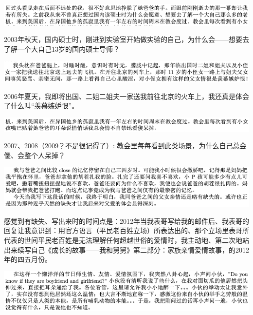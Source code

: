 \documentclass[9pt, b5paper]{article}
\begin{document}
\begin{center}
\includegraphics[width=.9\linewidth]{./pic/backups_plans_20210423_110746.png}
\end{center}

2003年秋天，国内硕士时，刚进到实验室开始做实验的自己，为什么会——想要去了解一个大自己13岁的国内硕士导师？

\begin{center}
\includegraphics[width=.9\linewidth]{./pic/backups_plans_20210423_104428.png}
\end{center}

2006年夏天，我即将出国、二姐二姐夫一家送我前往北京的火车上，我还真是体会了什么叫“羡慕嫉妒恨”。

\begin{center}
\includegraphics[width=.9\linewidth]{./pic/backups_plans_20210423_110834.png}
\end{center}

2007、2008（2009？不是很记得了）: 教会里每每看到此类场景，为什么自己总会傻、会整个人呆掉？

\begin{center}
\includegraphics[width=.9\linewidth]{./pic/backups_plans_20210423_105443.png}
\end{center}

感觉到有缺失、写出来时的时间点是：2012年当我表哥写给我的邮件后、我表哥的回复让我意识到：用官方语言（平民老百姓立场）所表达出的、那个立场里表哥所代表的世间平民老百姓是无法理解任何超越世俗的爱情时，我主动地、第二次地站出来续写自己《成长的故事——我和舅舅》第二部分：家族亲情爱情故事，的2012年的四五月份。

\begin{center}
\includegraphics[width=.9\linewidth]{./pic/backups_plans_20210422_114817.png}
\end{center}
\end{document}
